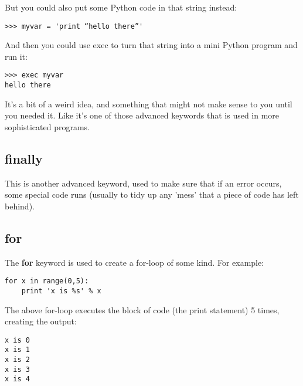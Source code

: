 \noindent
But you could also put some Python code in that string instead:

\begin{listing}
\begin{verbatim}
>>> myvar = 'print “hello there”'
\end{verbatim}
\end{listing}

\noindent
And then you could use exec to turn that string into a mini Python program and run it:

\begin{listing}
\begin{verbatim}
>>> exec myvar
hello there
\end{verbatim}
\end{listing}

It's a bit of a weird idea, and something that might not make sense to you until you needed it.  Like  it's one of those advanced keywords that is used in more sophisticated programs.

\subsection*{finally}

This is another advanced keyword, used to make sure that if an error occurs, some special code runs (usually to tidy up any 'mess' that a piece of code has left behind).

\subsection*{for}

The \textbf{for} keyword is used to create a for-loop of some kind. For example:

\begin{listing}
\begin{verbatim}
for x in range(0,5):
    print 'x is %s' % x
\end{verbatim}
\end{listing}

\noindent
The above for-loop executes the block of code (the print statement) 5 times, creating the output:

\begin{listing}
\begin{verbatim}
x is 0
x is 1
x is 2
x is 3
x is 4
\end{verbatim}
\end{listing}

